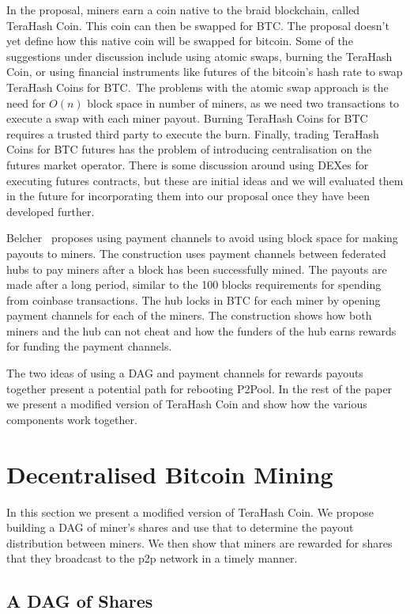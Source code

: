 \documentclass{article}
\begin{document}
In the proposal, miners earn a coin native to the braid blockchain,
called TeraHash Coin. This coin can then be swapped for BTC. The
proposal doesn't yet define how this native coin will be swapped for
bitcoin. Some of the suggestions under discussion include using atomic
swaps, burning the TeraHash Coin, or using financial instruments like
futures of the bitcoin's hash rate to swap TeraHash Coins for BTC.\
The problems with the atomic swap approach is the need for $O(n)$
block space in number of miners, as we need two transactions to
execute a swap with each miner payout. Burning TeraHash Coins for BTC
requires a trusted third party to execute the burn. Finally, trading
TeraHash Coins for BTC futures has the problem of introducing
centralisation on the futures market operator. There is some
discussion around using DEXes for executing futures contracts, but
these are initial ideas and we will evaluated them in the future for
incorporating them into our proposal once they have been developed
further.

Belcher~\cite{channels-for-rewards} proposes using payment channels to
avoid using block space for making payouts to miners. The construction
uses payment channels between federated hubs to pay miners after a
block has been successfully mined. The payouts are made after a long
period, similar to the 100 blocks requirements for spending from
coinbase transactions. The hub locks in BTC for each miner by opening
payment channels for each of the miners. The construction shows how
both miners and the hub can not cheat and how the funders of the hub
earns rewards for funding the payment channels.

The two ideas of using a DAG and payment channels for rewards
payouts together present a potential path for rebooting P2Pool. In the
rest of the paper we present a modified version of TeraHash Coin and
show how the various components work together.

\section{Decentralised Bitcoin Mining}

In this section we present a modified version of TeraHash Coin. We
propose building a DAG of miner's shares and use that to determine the
payout distribution between miners. We then show that miners are
rewarded for shares that they broadcast to the p2p network in a timely
manner.

\subsection{A DAG of Shares}
\end{document}
